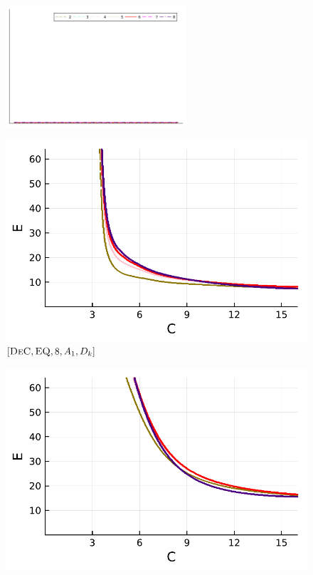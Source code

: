 \begin{figure}[!h]
	\centering
	\includegraphics[width=0.6\textwidth,trim={160 340 30 22}, clip]{pdf/pdepics/legends/colors_a-d_new_horiz_2-8_no_order.pdf}\\
	\begin{minipage}[t]{0.32\textwidth}
		\includegraphics[width=\textwidth]{pdf/pdepics/diff/IMEXDeC_subtimesteps_equispaced_diff_ord_2468.pdf}
		\centering
		$[\textsc{DeC},\textsc{EQ}, 8, A_1,D_k]$
	\end{minipage} 
	\begin{minipage}[t]{0.32\textwidth}
		\includegraphics[width=\textwidth]{pdf/pdepics/diff/IMEXDeC_equispaced_diff_ord_2468.pdf}

\end{minipage}
\end{figure}
